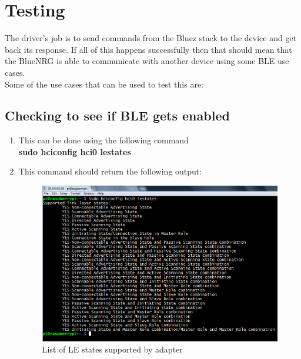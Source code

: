 \section{Testing}
The driver's job is to send commands from the Bluez stack to the device and get back its response. If all of this happens successfully then that should mean that the BlueNRG is able to communicate with another device using some BLE use cases.\\
Some of the use cases that can be used to test this are:
\subsection{Checking to see if BLE gets enabled} 
	\begin{enumerate}
		\item This can be done using the following command\\
			\textbf{sudo hciconfig hci0 lestates}
		\item This command should return the following output:
			\begin{figure}[ht]
			\centering
			\includegraphics[scale=0.5]{images/lestates.png}
			\caption{List of LE states supported by adapter}
		\end{figure}
	\end{enumerate}
